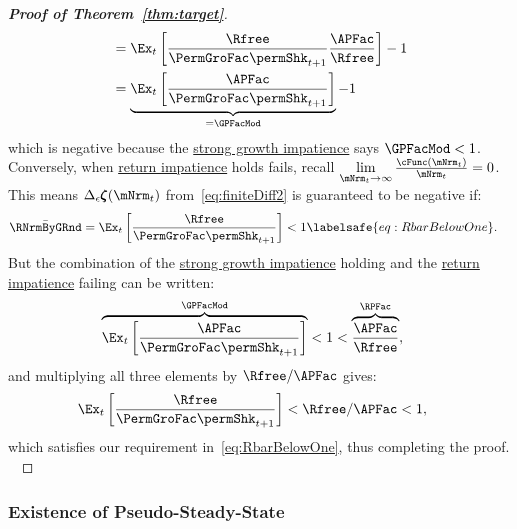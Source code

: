 \documentclass[\econtexRoot/BufferStockTheory]{subfiles}
\begin{document}
\begin{proof}[\textbf{Proof of Theorem~\ref{thm:target}}]
\begin{align*}
                                                            & = \Ex_{t}\left[\frac{\Rfree}{\PermGroFac \permShk_{t+1}}\frac{\APFac}{\Rfree}\right] - 1 \\
                                                            & = \underbrace{\Ex_{t}\left[\frac{\APFac}{\PermGroFac \permShk_{t+1}}\right]}_{= \GPFacMod} - 1 
\end{align*}
%
which is negative because the \hyperlink{GICMod}{strong growth impatience} says $\GPFacMod < 1$. Conversely, when \hyperlink{RIC}{return impatience} holds fails, recall $\lim\limits_{\mNrm_{t} \rightarrow \infty} \frac{\cFunc(\mNrm_{t})}{\mNrm_{t}} = 0$. This means $ \Delta_{\epsilon}\difFunc(\mNrm_{t})$ from~\eqref{eq:finiteDiff2} is guaranteed to be negative if:
%
\begin{align}
  \bar{\RNrmByGRnd} = \Ex_{t}\left[\frac{\Rfree}{\PermGroFac \permShk_{t+1}}\right] & < 1  \labelsafe{eq:RbarBelowOne}.
\end{align}
%
But the combination of the \hyperlink{GICMod}{strong growth impatience} holding and the \hyperlink{RIC}{return impatience} failing can be written:
%
\begin{align}\label{eq:GICStrRICfailst1}
  \overbrace{\Ex_{t}\left[\frac{\APFac}{\PermGroFac \permShk_{t+1}}\right]}^{\GPFacMod} & < 1 < \overbrace{\frac{\APFac}{\Rfree}}^{{\RPFac}},
\end{align}
%
and multiplying all three elements by $\Rfree/\APFac$ gives:
%
\begin{align}\label{eq:GICStrRICfailst2}
  \Ex_{t}\left[\frac{\Rfree}{\PermGroFac \permShk_{t+1}}\right] & < \Rfree/\APFac < 1,
\end{align}
%
which satisfies our requirement in~\eqref{eq:RbarBelowOne}, thus completing the proof. \


\end{proof}
  
\subsubsection{Existence of Pseudo-Steady-State}\label{subsubsec:AppxPseudoSS}
\end{document}
